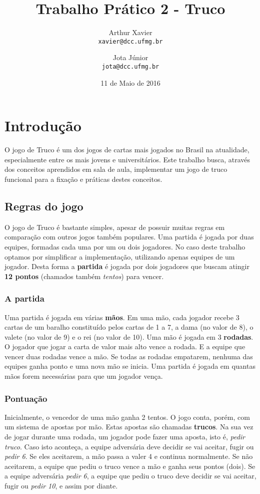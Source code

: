 \documentclass[a4paper,12pt]{article}
\title{Trabalho Prático 2 - Truco}
\author{
    Arthur Xavier\\
    \texttt{xavier@dcc.ufmg.br}
    \and
    Jota Júnior\\
    \texttt{jota@dcc.ufmg.br}
}
\date{11 de Maio de 2016}
\begin{document}
\maketitle

\section{Introdução}

O jogo de Truco é um dos jogos de cartas mais jogados no Brasil na atualidade, especialmente entre os mais jovens e universitários. Este trabalho busca, através dos conceitos aprendidos em sala de aula, implementar um jogo de truco funcional para a fixação e práticas destes conceitos.

\subsection{Regras do jogo}
O jogo de Truco é bastante simples, apesar de possuir muitas regras em comparação com outros jogos também populares. Uma partida é jogada por duas equipes, formadas cada uma por um ou dois jogadores. No caso deste trabalho optamos por simplificar a implementação, utilizando apenas equipes de um jogador. Desta forma a \textbf{partida} é jogada por dois jogadores que buscam atingir \textbf{12 pontos} (chamados também \emph{tentos}) para vencer.

\subsubsection{A partida}
Uma partida é jogada em várias \textbf{mãos}. Em uma mão, cada jogador recebe 3 cartas de um baralho constituído pelos cartas de 1 a 7, a dama (no valor de 8), o valete (no valor de 9) e o rei (no valor de 10). Uma mão é jogada em 3 \textbf{rodadas}. O jogador que jogar a carta de valor mais alto vence a rodada. E a equipe que vencer duas rodadas vence a mão. Se todas as rodadas empatarem, nenhuma das equipes ganha ponto e uma nova mão se inicia. Uma partida é jogada em quantas mãos forem necessárias para que um jogador vença.

\subsubsection{Pontuação}
Inicialmente, o vencedor de uma mão ganha 2 tentos. O jogo conta, porém, com um sistema de apostas por mão. Estas apostas são chamadas \textbf{trucos}. Na sua vez de jogar durante uma rodada, um jogador pode fazer uma aposta, isto é, \emph{pedir truco}. Caso isto aconteça, a equipe adversária deve decidir se vai aceitar, fugir ou \emph{pedir 6}. Se eles aceitarem, a mão passa a valer 4 e continua normalmente. Se não aceitarem, a equipe que pediu o truco vence a mão e ganha seus pontos (dois). Se a equipe adversária \emph{pedir 6}, a equipe que pediu o truco deve decidir se vai aceitar, fugir ou \emph{pedir 10}, e assim por diante.
\end{document}
